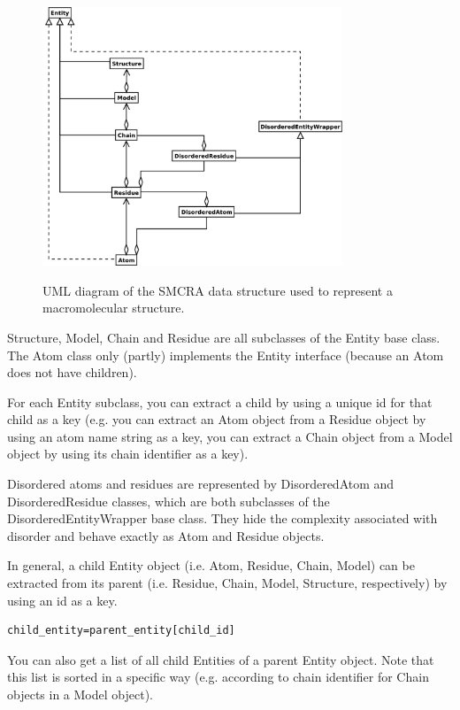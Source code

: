 \documentclass{report}
\begin{document}
\begin{latexonly}
\begin{figure}[htbp]
\centering
\includegraphics[width=0.8\textwidth]{images/smcra.png}
\label{fig:smcra}
\caption{UML diagram of the SMCRA data structure 
used to represent a macromolecular structure.}
\end{figure}
\end{latexonly}


Structure, Model, Chain and Residue are all subclasses of the Entity base class.
The Atom class only (partly) implements the Entity interface (because an Atom
does not have children). 

For each Entity subclass, you can extract a child by using a unique id for that
child as a key (e.g. you can extract an Atom object from a Residue object by
using an atom name string as a key, you can extract a Chain object from a Model
object by using its chain identifier as a key). 

Disordered atoms and residues are represented by DisorderedAtom and DisorderedResidue
classes, which are both subclasses of the DisorderedEntityWrapper base class.
They hide the complexity associated with disorder and behave exactly as Atom
and Residue objects. 

In general, a child Entity object (i.e. Atom, Residue, Chain, Model) can be
extracted from its parent (i.e. Residue, Chain, Model, Structure, respectively)
by using an id as a key.

\begin{verbatim}
child_entity=parent_entity[child_id]
\end{verbatim}

You can also get a list of all child Entities of a parent Entity object. Note
that this list is sorted in a specific way (e.g. according to chain identifier
for Chain objects in a Model object). 
\end{document}
